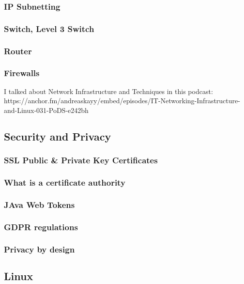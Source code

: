 \documentclass[12pt]{scrartcl} %
\begin{document}
\subsubsection{IP Subnetting}

\subsubsection{Switch, Level 3 Switch}

\subsubsection{Router}

\subsubsection{Firewalls}

I talked about Network Infrastructure and Techniques in this podcast: https://anchor.fm/andreaskayy/embed/episodes/IT-Networking-Infrastructure-and-Linux-031-PoDS-e242bh

\subsection{Security and Privacy}
\subsubsection{SSL Public \& Private Key Certificates}

\subsubsection{What is a certificate authority}

\subsubsection{JAva Web Tokens}


\subsubsection{GDPR regulations}

\subsubsection{Privacy by design}

\subsection{Linux}
\end{document}
